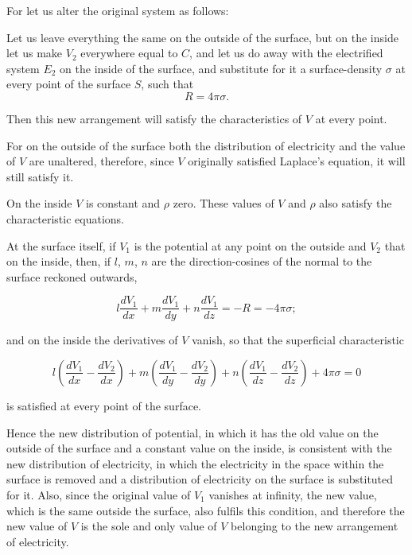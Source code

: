 \documentclass[11pt,a4paper]{article}
\begin{document}
For let us alter the original system as follows:

Let us leave everything the same on the outside of the surface, but on the inside let us make $V_2$ everywhere equal to $C$, and let us do away with the electrified system $E_2$ on the inside of the surface, and substitute for it a surface-density $\sigma$ at every point of the surface $S$, such that
\begin{equation}\tag{3}
R=4\pi\sigma.
\end{equation}

Then this new arrangement will satisfy the characteristics of $V$ at every point.

For on the outside of the surface both the distribution of electricity and the value of $V$ are unaltered, therefore, since $V$ originally satisfied Laplace's equation, it will still satisfy it.

On the inside $V$ is constant and $\rho$ zero. These values of $V$ and $\rho$ also satisfy the characteristic equations.

At the surface itself, if $V_1$ is the potential at any point on the outside and $V_2$ that on the inside, then, if $l$, $m$, $n$ are the direction-cosines of the normal to the surface reckoned outwards,

\begin{equation}\tag{4}
l\frac{dV_1}{dx}+m\frac{dV_1}{dy}+n\frac{dV_1}{dz}=-R=-4\pi\sigma;
\end{equation}

and on the inside the derivatives of $V$ vanish, so that the superficial characteristic

\begin{equation}\tag{5}
l\left(\frac{dV_1}{dx}-\frac{dV_2}{dx}\right)
+m\left(\frac{dV_1}{dy}-\frac{dV_2}{dy}\right)
+n\left(\frac{dV_1}{dz}-\frac{dV_2}{dz}\right)
+4\pi\sigma=0
\end{equation}

is satisfied at every point of the surface.

Hence the new distribution of potential, in which it has the old value on the outside of the surface and a constant value on the inside, is consistent with the new distribution of electricity, in which the electricity in the space within the surface is removed and a distribution of electricity on the surface is substituted for it. Also, since the original value of $V_1$ vanishes at infinity, the new value, which is the same outside the surface, also fulfils this condition, and therefore the new value of $V$ is the sole and only value of $V$ belonging to the new arrangement of electricity.
\end{document}
